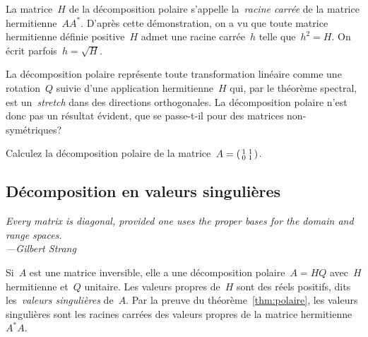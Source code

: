 La matrice~$H$ de la décomposition polaire s'appelle la~\emph{racine carrée}
de la matrice hermitienne~$AA^*$.  D'après cette démonstration, on a vu que
toute matrice hermitienne définie positive~$H$ admet une racine carrée~$h$
telle que~$h^2=H$.  On écrit parfois~$h=\sqrt H$.

La décomposition polaire représente toute transformation linéaire comme une
rotation~$Q$ suivie d'une application hermitienne~$H$ qui, par le théorème
spectral, est un~\emph{stretch} dans des directions orthogonales.  La
décomposition polaire n'est donc pas un résultat évident, que se passe-t-il
pour des matrices non-symétriques?

\begin{exercice}[difficile]
	Calculez la décomposition polaire de la
	matrice~$A=\left(\begin{smallmatrix}1&1\\0&1\end{smallmatrix}\right)$.
\end{exercice}

\subsection{Décomposition en valeurs singulières}

\emph{\small Every matrix is diagonal, provided one uses the proper bases for
the domain and range spaces.\\ \hfill---Gilbert Strang}

Si~$A$ est une matrice inversible, elle a une décomposition
polaire~$A=HQ$ avec~$H$ hermitienne et~$Q$ unitaire.  Les valeurs propres
de~$H$ sont des réels positifs, dits les~\emph{valeurs singulières} de~$A$.
Par la preuve du théorème~\ref{thm:polaire}, les valeurs singulières sont les
racines carrées des valeurs propres de la matrice hermitienne~$A^*A$.

